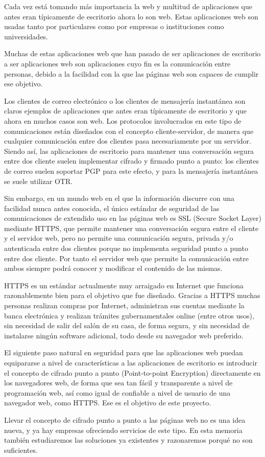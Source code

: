 
Cada vez está tomando más importancia la web y multitud de aplicaciones que antes eran típicamente de escritorio ahora lo son web. Estas aplicaciones web son usadas tanto por particulares como por empresas o instituciones como universidades.

Muchas de estas aplicaciones web que han pasado de ser aplicaciones de escritorio a ser aplicaciones web son aplicaciones cuyo fin es la comunicación entre personas, debido a la facilidad con la que las páginas web son capaces de cumplir ese objetivo.

Los clientes de correo electrónico o los clientes de mensajería instantánea son claros ejemplos de aplicaciones que antes eran típicamente de escritorio y que ahora en muchos casos son web. Los protocolos involucrados en este tipo de comunicaciones están diseñados con el concepto cliente-servidor, de manera que cualquier comunicación entre dos clientes pasa necesariamente por un servidor. Siendo así, las aplicaciones de escritorio para mantener una conversación segura entre dos cliente suelen implementar cifrado y firmado punto a punto: los clientes de correo suelen soportar PGP para este efecto, y para la mensajería instantánea se suele utilizar OTR.

Sin embargo, en un mundo web en el que la información discurre con una facilidad nunca antes conocida, el único estándar de seguridad de las comunicaciones de extendido uso en las páginas web es SSL (Secure Socket Layer) mediante HTTPS, que permite mantener una conversación segura entre el cliente y el servidor web, pero no permite una comunicación segura, privada y/o autenticada entre dos clientes porque no implementa seguridad punto a punto entre dos cliente. Por tanto el servidor web que permite la comunicación entre ambos siempre podrá conocer y modificar el contenido de las mismas.

HTTPS es un estándar actualmente muy arraigado en Internet que funciona razonablemente bien para el objetivo que fue diseñado. Gracias a HTTPS muchas personas realizan compras por Internet, administran sus cuentas mediante la banca electrónica y realizan trámites gubernamentales online (entre otros usos), sin necesidad de salir del salón de su casa, de forma segura, y sin necesidad de instalarse ningún software adicional, todo desde su navegador web preferido.

El siguiente paso natural en seguridad para que las aplicaciones web puedan equipararse a nivel de características a las aplicaciones de escritorio es introducir el concepto de cifrado punto a punto (Point-to-point Encryption) directamente en los navegadores web, de forma que sea tan fácil y transparente a nivel de programación web, así como igual de confiable a nivel de usuario de una navegador web, como HTTPS. Ese es el objetivo de este proyecto.

Llevar el concepto de cifrado punto a punto a las páginas web no es una idea nueva, y ya hay empresas ofreciendo servicios de este tipo. En esta memoria también estudiaremos las soluciones ya existentes y razonaremos porqué no son suficientes.

